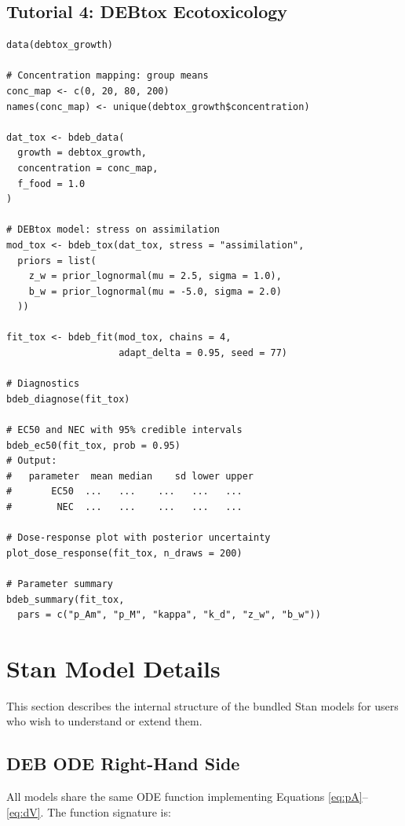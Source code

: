 \documentclass[11pt,a4paper]{article}
\begin{document}
\subsection{Tutorial 4: DEBtox Ecotoxicology}
\label{sec:tut-debtox}

\begin{lstlisting}
data(debtox_growth)

# Concentration mapping: group means
conc_map <- c(0, 20, 80, 200)
names(conc_map) <- unique(debtox_growth$concentration)

dat_tox <- bdeb_data(
  growth = debtox_growth,
  concentration = conc_map,
  f_food = 1.0
)

# DEBtox model: stress on assimilation
mod_tox <- bdeb_tox(dat_tox, stress = "assimilation",
  priors = list(
    z_w = prior_lognormal(mu = 2.5, sigma = 1.0),
    b_w = prior_lognormal(mu = -5.0, sigma = 2.0)
  ))

fit_tox <- bdeb_fit(mod_tox, chains = 4,
                    adapt_delta = 0.95, seed = 77)

# Diagnostics
bdeb_diagnose(fit_tox)

# EC50 and NEC with 95% credible intervals
bdeb_ec50(fit_tox, prob = 0.95)
# Output:
#   parameter  mean median    sd lower upper
#       EC50  ...   ...    ...   ...   ...
#        NEC  ...   ...    ...   ...   ...

# Dose-response plot with posterior uncertainty
plot_dose_response(fit_tox, n_draws = 200)

# Parameter summary
bdeb_summary(fit_tox,
  pars = c("p_Am", "p_M", "kappa", "k_d", "z_w", "b_w"))
\end{lstlisting}


\section{Stan Model Details}
\label{sec:stan-details}

This section describes the internal structure of the bundled Stan models
for users who wish to understand or extend them.

\subsection{DEB ODE Right-Hand Side}

All models share the same ODE function implementing Equations
\eqref{eq:pA}--\eqref{eq:dV}.  The function signature is:
\end{document}
